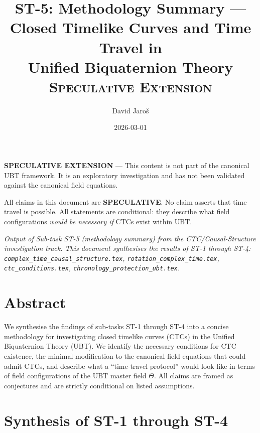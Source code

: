 \documentclass[12pt]{article}
\title{ST-5: Methodology Summary —\\
Closed Timelike Curves and Time Travel in\\
Unified Biquaternion Theory\\[0.5em]
\large\textsc{Speculative Extension}}
\author{David Jaroš}
\date{2026-03-01}
\begin{document}
\maketitle

\begin{tcolorbox}[colback=yellow!10, title=Status]
\textbf{SPECULATIVE EXTENSION} — This content is not part of
the canonical UBT framework. It is an exploratory investigation
and has not been validated against the canonical field equations.
\end{tcolorbox}

\vspace{1em}
\begin{tcolorbox}[colback=red!5, title=Framing Requirement]
All claims in this document are \textbf{SPECULATIVE}.
No claim asserts that time travel is possible.
All statements are conditional: they describe what field configurations
\emph{would be necessary if} CTCs exist within UBT.
\end{tcolorbox}

\vspace{0.5em}
\noindent\textit{Output of Sub-task ST-5 (methodology summary) from the
CTC/Causal-Structure investigation track.  This document synthesises the
results of ST-1 through ST-4:
\texttt{complex\_time\_causal\_structure.tex},
\texttt{rotation\_complex\_time.tex},
\texttt{ctc\_conditions.tex},
\texttt{chronology\_protection\_ubt.tex}.}

\section*{Abstract}
We synthesise the findings of sub-tasks ST-1 through ST-4 into a concise
methodology for investigating closed timelike curves (CTCs) in the
Unified Biquaternion Theory (UBT).  We identify the necessary conditions
for CTC existence, the minimal modification to the canonical field
equations that could admit CTCs, and describe what a ``time-travel
protocol'' would look like in terms of field configurations of the UBT
master field $\Theta$.  All claims are framed as conjectures and are
strictly conditional on listed assumptions.

\section{Synthesis of ST-1 through ST-4}
\end{document}
